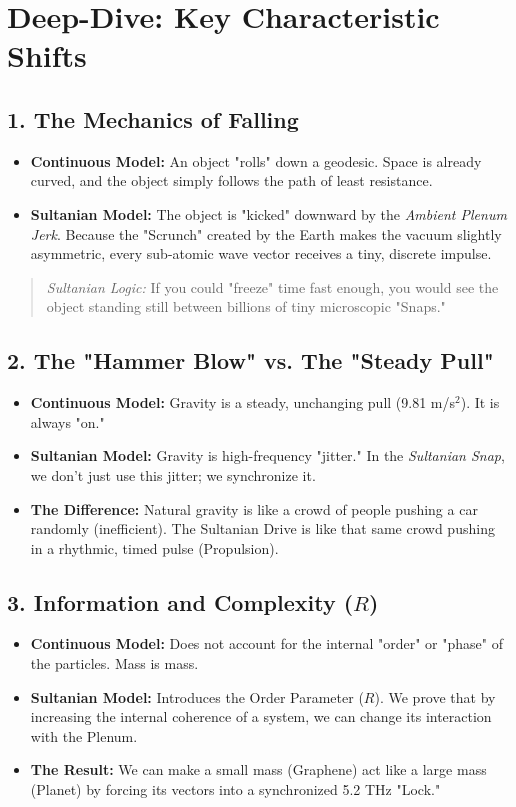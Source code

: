 \documentclass[11pt]{article}
\begin{document}
\section*{Deep-Dive: Key Characteristic Shifts}

\subsection{1. The Mechanics of Falling}
\begin{itemize}
    \item \textbf{Continuous Model:} An object "rolls" down a geodesic. Space is already curved, and the object simply follows the path of least resistance.
    \item \textbf{Sultanian Model:} The object is "kicked" downward by the \textit{Ambient Plenum Jerk}. Because the "Scrunch" created by the Earth makes the vacuum slightly asymmetric, every sub-atomic wave vector receives a tiny, discrete impulse.
\end{itemize}
\begin{quote}
    \textit{Sultanian Logic:} If you could "freeze" time fast enough, you would see the object standing still between billions of tiny microscopic "Snaps."
\end{quote}

\subsection{2. The "Hammer Blow" vs. The "Steady Pull"}
\begin{itemize}
    \item \textbf{Continuous Model:} Gravity is a steady, unchanging pull (9.81 m/s$^2$). It is always "on."
    \item \textbf{Sultanian Model:} Gravity is high-frequency "jitter." In the \textit{Sultanian Snap}, we don't just use this jitter; we synchronize it.
    \item \textbf{The Difference:} Natural gravity is like a crowd of people pushing a car randomly (inefficient). The Sultanian Drive is like that same crowd pushing in a rhythmic, timed pulse (Propulsion).
\end{itemize}

\subsection{3. Information and Complexity ($R$)}
\begin{itemize}
    \item \textbf{Continuous Model:} Does not account for the internal "order" or "phase" of the particles. Mass is mass.
    \item \textbf{Sultanian Model:} Introduces the Order Parameter ($R$). We prove that by increasing the internal coherence of a system, we can change its interaction with the Plenum.
    \item \textbf{The Result:} We can make a small mass (Graphene) act like a large mass (Planet) by forcing its vectors into a synchronized 5.2 THz "Lock."
\end{itemize}
\end{document}

